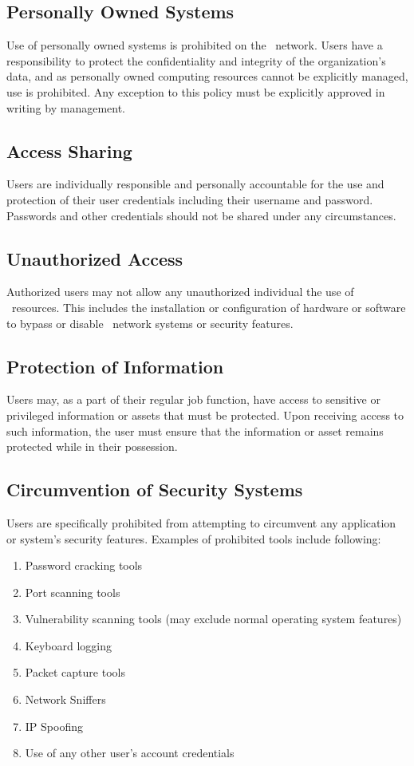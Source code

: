 \documentclass[use]{policy}
\begin{document}
		\subsection{Personally Owned Systems}
			Use of personally owned systems is prohibited on the \theOrganization\  network.  Users have a responsibility to protect the confidentiality and integrity of the organization’s data, and as personally owned computing resources cannot be explicitly managed, use is prohibited.  Any exception to this policy must be explicitly approved in writing by management.
		
		\subsection{Access Sharing}
			Users are individually responsible and personally accountable for the use and protection of their user credentials including their username and password.  Passwords and other credentials should not be shared under any circumstances.
		
		\subsection{Unauthorized Access}
			Authorized users may not allow any unauthorized individual the use of \theOrganization\  resources.  This includes the installation or configuration of hardware or software to bypass or disable \theOrganization\  network systems or security features.
		
		\subsection{Protection of Information}
			Users may, as a part of their regular job function, have access to sensitive or privileged information or assets that must be protected.  Upon receiving access to such information, the user must ensure that the information or asset remains protected while in their possession.
	
		\subsection{Circumvention of Security Systems}
			Users are specifically prohibited from attempting to circumvent any application or system’s security features.  Examples of prohibited tools include following:
			\begin{enumerate}[label=\alph*)]
				\item Password cracking tools
				\item Port scanning tools
				\item Vulnerability scanning tools (may exclude normal operating system features)
				\item Keyboard logging
				\item Packet capture tools
				\item Network Sniffers
				\item IP Spoofing
				\item Use of any other user’s account credentials
			\end{enumerate}
			
\end{document}
